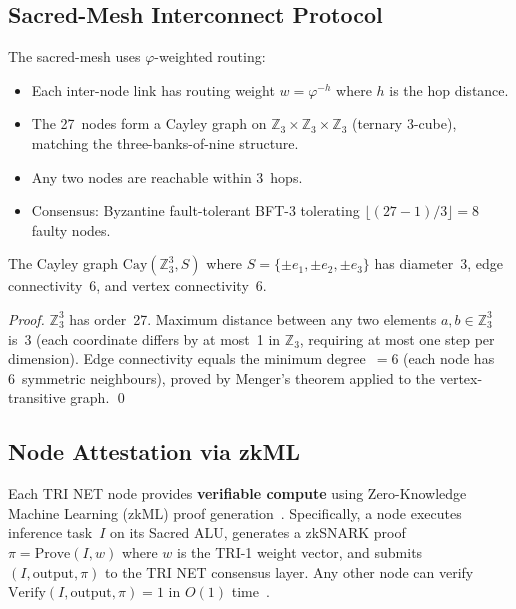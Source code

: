 \subsection{Sacred-Mesh Interconnect Protocol}

The sacred-mesh uses \(\varphi\)-weighted routing:
\begin{itemize}
  \item Each inter-node link has routing weight \(w = \varphi^{-h}\) where \(h\)
        is the hop distance.
  \item The 27~nodes form a Cayley graph on \(\mathbb{Z}_3 \times \mathbb{Z}_3 \times
        \mathbb{Z}_3\) (ternary 3-cube), matching the three-banks-of-nine structure.
  \item Any two nodes are reachable within 3~hops.
  \item Consensus: Byzantine fault-tolerant BFT-3 tolerating
        \(\lfloor(27-1)/3\rfloor = 8\) faulty nodes.
\end{itemize}

\begin{lemma}\label{lem:sacred-mesh}
The Cayley graph \(\mathrm{Cay}(\mathbb{Z}_3^3, S)\) where
\(S = \{\pm e_1, \pm e_2, \pm e_3\}\) has diameter~3, edge connectivity~6,
and vertex connectivity~6.
\end{lemma}

\begin{proof}
\(\mathbb{Z}_3^3\) has order~27.
Maximum distance between any two elements \(a, b \in \mathbb{Z}_3^3\) is~3
(each coordinate differs by at most~1 in \(\mathbb{Z}_3\), requiring at most
one step per dimension).
Edge connectivity equals the minimum degree~\(= 6\) (each node has 6~symmetric
neighbours), proved by Menger's theorem applied to the vertex-transitive graph.
\qed
\end{proof}

\subsection{Node Attestation via zkML}

Each TRI NET node provides \textbf{verifiable compute} using Zero-Knowledge
Machine Learning (zkML) proof generation~\cite{peng2025zkml}.
Specifically, a node executes inference task~\(I\) on its Sacred ALU,
generates a zkSNARK proof \(\pi = \mathrm{Prove}(I, w)\) where \(w\) is the
TRI-1 weight vector, and submits \((I, \mathrm{output}, \pi)\) to the TRI NET
consensus layer.
Any other node can verify \(\mathrm{Verify}(I, \mathrm{output}, \pi) = 1\) in
\(O(1)\) time~\cite{fan2023rollup}.


